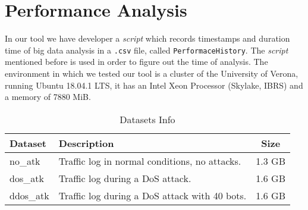 \section{Performance Analysis}
In our tool we have developer a \textit{script} which records timestamps and duration time of big data analysis in a \texttt{.csv} file, called \texttt{PerformaceHistory}. The \textit{script} mentioned before is used in order to figure out the time of analysis. 
The environment in which we tested our tool is a cluster of the University of Verona, running Ubuntu 18.04.1 LTS, it has an  Intel Xeon Processor (Skylake, IBRS) and a memory of 7880 MiB. 

\begin{table}[h]
\centering
\begin{tabular}{|l|l|c|}
\hline
\textbf{Dataset} & \textbf{Description}                              & \textbf{Size} \\ \hline
no\_atk          & Traffic log in normal conditions, no attacks. & 1.3 GB        \\ 
dos\_atk         & Traffic log during a DoS attack.                   & 1.6 GB        \\ 
ddos\_atk        & Traffic log during a DoS attack with 40 bots. & 1.6 GB        \\ \hline
\end{tabular}
\caption{Datasets Info}
\label{tab:dataset_info}
\end{table}